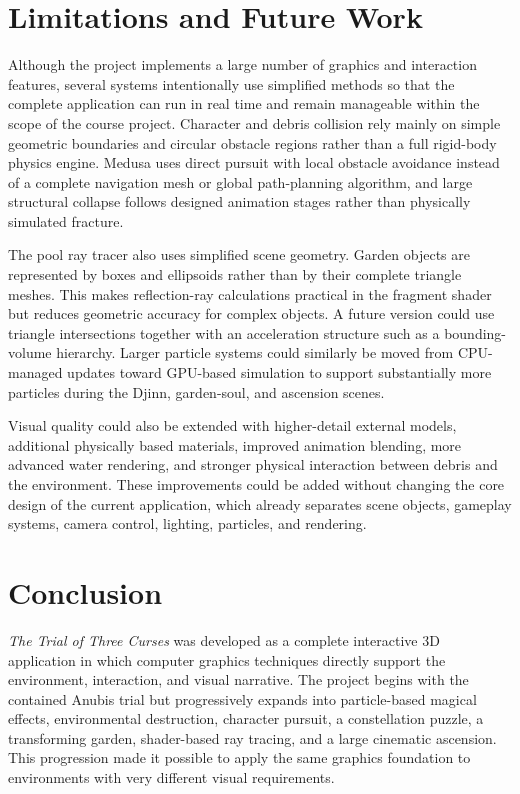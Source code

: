 \documentclass[11pt,a4paper]{article}
\begin{document}
\section{Limitations and Future Work}

Although the project implements a large number of graphics and interaction
features, several systems intentionally use simplified methods so that the
complete application can run in real time and remain manageable within the
scope of the course project. Character and debris collision rely mainly on
simple geometric boundaries and circular obstacle regions rather than a full
rigid-body physics engine. Medusa uses direct pursuit with local obstacle
avoidance instead of a complete navigation mesh or global path-planning
algorithm, and large structural collapse follows designed animation stages
rather than physically simulated fracture.

The pool ray tracer also uses simplified scene geometry. Garden objects are
represented by boxes and ellipsoids rather than by their complete triangle
meshes. This makes reflection-ray calculations practical in the fragment shader
but reduces geometric accuracy for complex objects. A future version could use
triangle intersections together with an acceleration structure such as a
bounding-volume hierarchy. Larger particle systems could similarly be moved
from CPU-managed updates toward GPU-based simulation to support substantially
more particles during the Djinn, garden-soul, and ascension scenes.

Visual quality could also be extended with higher-detail external models,
additional physically based materials, improved animation blending, more
advanced water rendering, and stronger physical interaction between debris and
the environment. These improvements could be added without changing the core
design of the current application, which already separates scene objects,
gameplay systems, camera control, lighting, particles, and rendering.



\section{Conclusion}

\textit{The Trial of Three Curses} was developed as a complete interactive 3D
application in which computer graphics techniques directly support the
environment, interaction, and visual narrative. The project begins with the
contained Anubis trial but progressively expands into particle-based magical
effects, environmental destruction, character pursuit, a constellation puzzle,
a transforming garden, shader-based ray tracing, and a large cinematic
ascension. This progression made it possible to apply the same graphics
foundation to environments with very different visual requirements.
\end{document}
